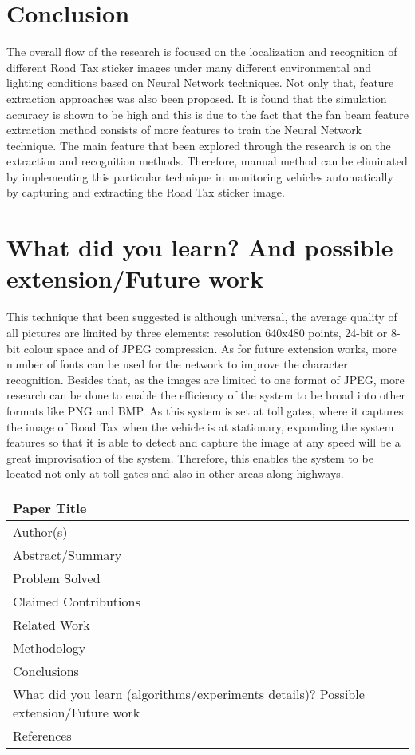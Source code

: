 \documentclass[12pt]{article}
\begin{document}
\section{Conclusion}
The overall flow of the research is focused on the localization and recognition of different Road Tax sticker images under many different environmental and lighting conditions based on Neural Network techniques. Not only that, feature extraction approaches was also been proposed. It is found that the simulation accuracy is shown to be high and this is due to the fact that the fan beam feature extraction method consists of more features to train the Neural Network technique. The main feature that been explored through the research is on the extraction and recognition methods. Therefore, manual method can be eliminated by implementing this particular technique in monitoring vehicles automatically by capturing and extracting the Road Tax sticker image. 
\section{What did you learn? And possible extension/Future work}
This technique that been suggested is although universal, the average quality of all pictures are limited by three elements: resolution 640x480 points, 24-bit or 8-bit colour space and of JPEG compression. As for future extension works, more number of fonts can be used for the network to improve the character recognition. Besides that, as the images are limited to one format of JPEG, more research can be done to enable the efficiency of the system to be broad into other formats like PNG and BMP. 
As this system is set at toll gates, where it captures the image of Road Tax when the vehicle is at stationary, expanding the system features so that it is able to detect and capture the image at any speed will be a great improvisation of the system. Therefore, this enables the system to be located not only at toll gates and also in other areas along highways.   

\pagebreak



\begin{tabular}{|m{6cm} |m{10cm}|}
\hline 
Paper Title & \\ 
\hline 
Author(s) & \\ 
\hline 
Abstract/Summary & \\ 
\hline 
Problem Solved & \\ 
\hline 
Claimed Contributions & \\ 
\hline 
Related Work & \\ 
\hline 
Methodology & \\ 
\hline 
Conclusions & \\ 
\hline 
What did you learn 
\newline (algorithms/experiments
details)?
\newline
\newline 
Possible extension/Future
work & \\ 
\hline 
References & \\ 
\hline 
\end{tabular} 
\end{document}
